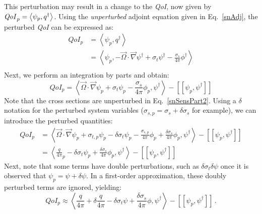 \documentclass[12pt]{report}
\newcommand{\vO}{\vec{\Omega}}
\newcommand{\bra}{\left\langle}
\newcommand{\ket}{\right\rangle}
\newcommand{\sbraSN}{\left[ \! \left[}
\newcommand{\sketSN}{\right] \! \right]}
\newcommand{\sbra}{\left[}
\newcommand{\sket}{\right]}
\newcommand{\grad}{\vec{\nabla}}
\newcommand{\sigt}{\sigma_t}
\newcommand{\sigs}{\sigma_s}
\newcommand{\angSource}{\frac{q}{4 \pi}}
\newcommand{\angResp}{q^\dag}
\newcommand{\qoi}{{\it QoI}\xspace}
\begin{document}
This perturbation may result in a change to the \qoi, now given by $\qoi_p=\bra \psi_p , \angResp \ket$. Using the {\it unperturbed} adjoint equation given in Eq.~\eqref{snAdj},
the perturbed \qoi can be expressed as:
\begin{equation}
\label{snSensPart}
\begin{split}
QoI_p &=\bra \psi_p , \angResp \ket \\
&=\bra \psi_p , - \vO \cdot \grad \psi^\dag + \sigt \psi^\dag - \frac{\sigs}{4 \pi} \phi^\dag  \ket \\
\end{split}
\end{equation}
Next, we perform an integration by parts and obtain:
\begin{equation}
\label{snSensPart2}
QoI_p = \bra  \vO \cdot \grad \psi_p + \sigt \psi_p - \frac{\sigs}{4 \pi} \phi_p , \psi^\dag  \ket - \sbraSN \psi_p, \psi^\dag \sketSN
\end{equation}
Note that the cross sections are unperturbed in Eq.~\eqref{snSensPart2}.
Using a $\delta$ notation for the perturbed system variables ($\sigma_{s,p} = \sigs + \delta \sigs$ for example), we
can introduce the perturbed quantities:
\begin{equation}
\label{snSensPart3}
\begin{split}
QoI_p &= \bra  \vO \cdot \grad \psi_p + \sigma_{t,p}\psi_p - \delta\sigt\psi_p - \frac{\sigma_{s,p}}{4 \pi} \phi_p
+\frac{\delta \sigs}{4 \pi} \phi_p
 , \psi^\dag  \ket - \sbraSN \psi_p, \psi^\dag \sketSN \\
 &= \bra  \angSource_p - \delta\sigt\psi_p + \frac{\delta \sigs}{4 \pi} \phi_p
 , \psi^\dag  \ket - \sbraSN \psi_p, \psi^\dag \sketSN
\end{split}
\end{equation}
Next, note that some terms have double perturbations, such as $\delta \sigt \delta \psi$ once it is observed
that $\psi_p=\psi+\delta\psi$. 
In a first-order approximation, these doubly perturbed terms are ignored, yielding:
\begin{equation}
\label{snAdjQoI}
QoI_p \approx \bra  \angSource + \delta \angSource - \delta\sigt\psi + \frac{\delta \sigs}{4 \pi} \phi
 , \psi^\dag  \ket - \sbraSN \psi_p, \psi^\dag \sketSN \,.
\end{equation}
\end{document}
